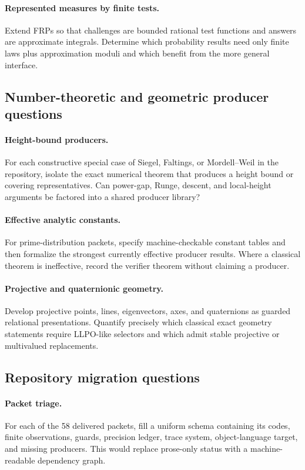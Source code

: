 \paragraph{Represented measures by finite tests.}
Extend FRPs so that challenges are bounded rational test functions and answers
are approximate integrals.  Determine which probability results need only
finite laws plus approximation moduli and which benefit from the more general
interface.

\subsection{Number-theoretic and geometric producer questions}

\paragraph{Height-bound producers.}
For each constructive special case of Siegel, Faltings, or Mordell--Weil in the
repository, isolate the exact numerical theorem that produces a height bound or
covering representatives.  Can power-gap, Runge, descent, and local-height
arguments be factored into a shared producer library?

\paragraph{Effective analytic constants.}
For prime-distribution packets, specify machine-checkable constant tables and
then formalize the strongest currently effective producer results.  Where a
classical theorem is ineffective, record the verifier theorem without claiming
a producer.

\paragraph{Projective and quaternionic geometry.}
Develop projective points, lines, eigenvectors, axes, and quaternions as
guarded relational presentations.  Quantify precisely which classical exact
geometry statements require LLPO-like selectors and which admit stable
projective or multivalued replacements.

\subsection{Repository migration questions}

\paragraph{Packet triage.}
For each of the 58 delivered packets, fill a uniform schema containing its
codes, finite observations, guards, precision ledger, trace system,
object-language target, and missing producers.  This would replace prose-only
status with a machine-readable dependency graph.


